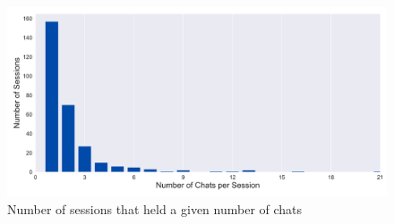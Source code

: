 \begin{figure}[H]
    \centering
    \includegraphics[width=\textwidth]{results/plots/assets/usage-12-number-of-sessions-with-number-of-chats.png}
    \caption{Number of sessions that held a given number of chats}
    \label{fig:usage_12_number_of_sessions_with_number_of_chats}
\end{figure}